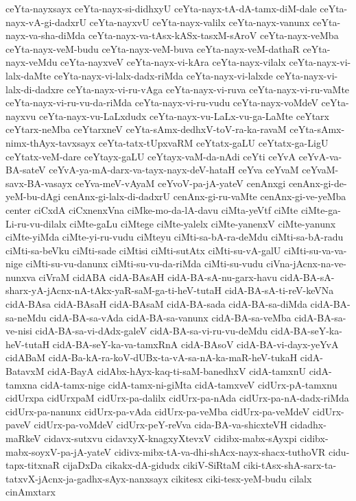 {ceYta-nayxsayx
ceYta-nayx-si-didhxyU
ceYta-nayx-tA-dA-tamx-diM-dale
ceYta-nayx-vA-gi-dadxrU
ceYta-nayxvU
ceYta-nayx-valilx
ceYta-nayx-vanunx
ceYta-nayx-va-sha-diMda
ceYta-nayx-va-tAsx-kASx-tasxM-sAroV
ceYta-nayx-veMba
ceYta-nayx-veM-budu
ceYta-nayx-veM-buva
ceYta-nayx-veM-dathaR
ceYta-nayx-veMdu
ceYta-nayxveV
ceYta-nayx-vi-kAra
ceYta-nayx-vilalx
ceYta-nayx-vi-lalx-daMte
ceYta-nayx-vi-lalx-dadx-riMda
ceYta-nayx-vi-lalxde
ceYta-nayx-vi-lalx-di-dadxre
ceYta-nayx-vi-ru-vAga
ceYta-nayx-vi-ruva
ceYta-nayx-vi-ru-vaMte
ceYta-nayx-vi-ru-vu-da-riMda
ceYta-nayx-vi-ru-vudu
ceYta-nayx-voMdeV
ceYta-nayxvu
ceYta-nayx-vu-LaLxdudx
ceYta-nayx-vu-LaLx-vu-ga-LaMte
ceYtarx
ceYtarx-neMba
ceYtarxneV
ceYta-sAmx-dedhxV-toV-ra-ka-ravaM
ceYta-sAmx-nimx-thAyx-tavxsayx
ceYta-tatx-tUpxvaRM
ceYtatx-gaLU
ceYtatx-ga-LigU
ceYtatx-veM-dare
ceYtayx-gaLU
ceYtayx-vaM-da-nAdi
ceYti
ceYvA
ceYvA-va-BA-sateV
ceYvA-ya-mA-darx-va-tayx-nayx-deV-hataH
ceYva
ceYvaM
ceYvaM-savx-BA-vasayx
ceYva-meV-vAyaM
ceYvoV-pa-jA-yateV
cenAnxgi
cenAnx-gi-de-yeM-bu-dAgi
cenAnx-gi-lalx-di-dadxrU
cenAnx-gi-ru-vaMte
cenAnx-gi-ve-yeMba
center
ciCxdA
ciCxnenxVna
ciMke-mo-da-lA-davu
ciMta-yeVtf
ciMte
ciMte-ga-Li-ru-vu-dilalx
ciMte-gaLu
ciMtege
ciMte-yalelx
ciMte-yanenxV
ciMte-yanunx
ciMte-yiMda
ciMte-yi-ru-vudu
ciMteyu
ciMti-sa-bA-ra-deMdu
ciMti-sa-bA-radu
ciMti-sa-beVku
ciMti-sade
ciMtisi
ciMti-sutAtx
ciMti-su-vA-galU
ciMti-su-va-va-nige
ciMti-su-vu-danunx
ciMti-su-vu-da-riMda
ciMti-su-vudu
ciVna-jAcnx-na-ve-nunxva
ciVraM
cidABA
cidA-BAsAH
cidA-BA-sA-nu-garx-havu
cidA-BA-sA-sharx-yA-jAcnx-nA-tAkx-yaR-saM-ga-ti-heV-tutaH
cidA-BA-sA-ti-reV-keVNa
cidA-BAsa
cidA-BAsaH
cidA-BAsaM
cidA-BA-sada
cidA-BA-sa-diMda
cidA-BA-sa-neMdu
cidA-BA-sa-vAda
cidA-BA-sa-vanunx
cidA-BA-sa-veMba
cidA-BA-sa-ve-nisi
cidA-BA-sa-vi-dAdx-galeV
cidA-BA-sa-vi-ru-vu-deMdu
cidA-BA-seY-ka-heV-tutaH
cidA-BA-seY-ka-va-tamxRnA
cidA-BAsoV
cidA-BA-vi-dayx-yeYvA
cidABaM
cidA-Ba-kA-ra-koV-dUBx-ta-vA-sa-nA-ka-maR-heV-tukaH
cidA-BatavxM
cidA-BayA
cidAbx-hAyx-kaq-ti-saM-banedhxV
cidA-tamxnU
cidA-tamxna
cidA-tamx-nige
cidA-tamx-ni-giMta
cidA-tamxveV
cidUrx-pA-tamxnu
cidUrxpa
cidUrxpaM
cidUrx-pa-dalilx
cidUrx-pa-nAda
cidUrx-pa-nA-dadx-riMda
cidUrx-pa-nanunx
cidUrx-pa-vAda
cidUrx-pa-veMba
cidUrx-pa-veMdeV
cidUrx-paveV
cidUrx-pa-voMdeV
cidUrx-peY-reVva
cida-BA-va-shicxteVH
cidadhx-maRkeV
cidavx-sutxvu
cidavxyX-knagxyXtevxV
cidibx-mabx-sAyxpi
cidibx-mabx-soyxV-pa-jA-yateV
cidivx-mibx-tA-va-dhi-shAcx-nayx-shacx-tuthoVR
cidu-tapx-titxnaR
cijaDxDa
cikakx-dA-gidudx
cikiV-SiRtaM
ciki-tAsx-shA-sarx-ta-tatxvX-jAcnx-ja-gadhx-sAyx-nanxsayx
cikitesx
ciki-tesx-yeM-budu
cilalx
cinAmxtarx
}

